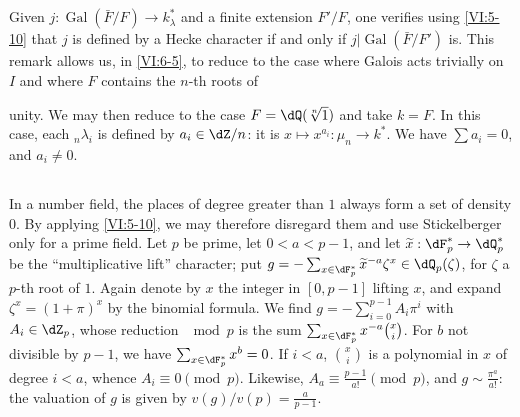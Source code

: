 \documentclass[oneside]{book}
\DeclareMathOperator{\gal}{Gal}
\newcounter{char}
\theoremstyle{sga-source}
\theoremstyle{sga-source-dash}
\theoremstyle{sga-source-dotdash}
\theoremstyle{sga-source-number-note-dash}
\theoremstyle{sga-source-note-number-dotdash}
\theoremstyle{sga-source-example-dotdash}
\theoremstyle{sga-source-inline-number}
\theoremstyle{sga-source-bare-number}
\theoremstyle{sga-source}
\newcommand{\PrintPage}[1]{}\newcommand{\MathPage}[1]{}\newcommand{\PrintCite}[2]{#1}\newcommand{\var}[3]{#1}
\begin{document}
\subsection{}\label{VI:6-6}

Given $j:\gal(\bar F/F) \to k_\lambda^\ast$ and a finite extension 
$F'/F$, one verifies using \ref{VI:5-10} that $j$ is defined by a 
Hecke character if and only if $j|\gal(\bar F/F')$ is. This 
remark allows us, in \ref{VI:6-5}, to reduce to the case where Galois acts 
trivially on $I$ and where $F$ contains the $n$-th roots of 
\PrintPage{216}
unity. We may then reduce to the case $F=\dQ(\sqrt[n]{1})$ and 
take $k=F$. In this case, each $_n \lambda_i$ is defined by 
$a_i\in \dZ/n$: it is $x\mapsto x^{a_i}:\mu_n \to k^\ast$. We have 
$\sum a_i=0$, and $a_i\ne 0$. 





\subsection{}\label{VI:6-7}

In a number field, the places of degree greater than $1$ always form \var{a set of density $0$}{a set of density $1$}{S45-SOL-0908}. By applying \ref{VI:5-10}, we may therefore disregard 
them and use Stickelberger only for a prime field. Let 
$p$ be prime, let $0<a<p-1$, and let $\widetilde x:\dF_p^\ast \to \dQ_p^\ast$ be the 
``multiplicative lift'' character; put 
  $g=-\sum_{x\in \dF_p^\ast} \widetilde x^{-a} \zeta^x\in \dQ_p(\zeta)$, for 
$\zeta$ a $p$-th root of $1$. Again denote by $x$ the integer in $[0,p-1]$ 
  lifting $x$, and expand $\zeta^x=(1+\pi)^x$ by the binomial formula. 
  We find $g=-\sum_{i=0}^{p-1} A_i\pi^i$ with $A_i\in \dZ_p$, whose reduction 
$\mod p$ is the sum $\sum_{x\in \dF_p^\ast} x^{-a} \binom x i$. For $b$ not 
divisible by $p-1$, we have $\sum_{x\in \dF_p^\ast} x^b=0$. If $i<a$, 
$\binom x i$ is a polynomial in $x$ of degree $i<a$, whence 
$A_i\equiv 0\pmod p$. Likewise, $A_a\equiv \frac{p-1}{a!} \pmod p$, and 
$g\sim \frac{\pi^a}{a!}$: the valuation of $g$ is given by 
$v(g)/v(p) = \frac{a}{p-1}$. 





\subsection{}\label{VI:6-8}
\end{document}
